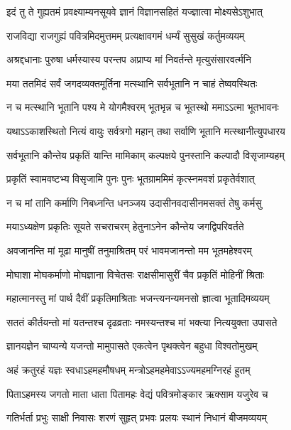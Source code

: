 \twolineshloka
{इदं तु ते गुह्यतमं प्रवक्ष्याम्यनसूयवे}
{ज्ञानं विज्ञानसहितं यज्ज्ञात्वा मोक्ष्यसेऽशुभात्}%

\twolineshloka
{राजविद्या राजगुह्यं पवित्रमिदमुत्तमम्}
{प्रत्यक्षावगमं धर्म्यं सुसुखं कर्तुमव्ययम्}%

\twolineshloka
{अश्रद्दधानाः पुरुषा धर्मस्यास्य परन्तप}
{अप्राप्य मां निवर्तन्ते मृत्युसंसारवर्त्मनि}%

\twolineshloka
{मया ततमिदं सर्वं जगदव्यक्तमूर्तिना}
{मत्स्थानि सर्वभूतानि न चाहं तेष्ववस्थितः}%

\twolineshloka
{न च मत्स्थानि भूतानि पश्य मे योगमैश्वरम्}
{भूतभृन्न च भूतस्थो ममाऽऽत्मा भूतभावनः}%

\twolineshloka
{यथाऽऽकाशस्थितो नित्यं वायुः सर्वत्रगो महान्}
{तथा सर्वाणि भूतानि मत्स्थानीत्युपधारय}%

\twolineshloka
{सर्वभूतानि कौन्तेय प्रकृतिं यान्ति मामिकाम्}
{कल्पक्षये पुनस्तानि कल्पादौ विसृजाम्यहम्}%

\twolineshloka
{प्रकृतिं स्वामवष्टभ्य विसृजामि पुनः पुनः}
{भूतग्राममिमं कृत्स्नमवशं प्रकृतेर्वशात्}%

\twolineshloka
{न च मां तानि कर्माणि निबध्नन्ति धनञ्जय}
{उदासीनवदासीनमसक्तं तेषु कर्मसु}%

\twolineshloka
{मयाऽध्यक्षेण प्रकृतिः सूयते सचराचरम्}
{हेतुनाऽनेन कौन्तेय जगद्विपरिवर्तते}%

\twolineshloka
{अवजानन्ति मां मूढा मानुषीं तनुमाश्रितम्}
{परं भावमजानन्तो मम भूतमहेश्वरम्}%

\twolineshloka
{मोघाशा मोघकर्माणो मोघज्ञाना विचेतसः}
{राक्षसीमासुरीं चैव प्रकृतिं मोहिनीं श्रिताः}%

\twolineshloka
{महात्मानस्तु मां पार्थ दैवीं प्रकृतिमाश्रिताः}
{भजन्त्यनन्यमनसो ज्ञात्वा भूतादिमव्ययम्}%

\twolineshloka
{सततं कीर्तयन्तो मां यतन्तश्च दृढव्रताः}
{नमस्यन्तश्च मां भक्त्या नित्ययुक्ता उपासते}%

\twolineshloka
{ज्ञानयज्ञेन चाप्यन्ये यजन्तो मामुपासते}
{एकत्वेन पृथक्त्वेन बहुधा विश्वतोमुखम्}%

\twolineshloka
{अहं क्रतुरहं यज्ञः स्वधाऽहमहमौषधम्}
{मन्त्रोऽहमहमेवाऽऽज्यमहमग्निरहं हुतम्}%

\twolineshloka
{पिताऽहमस्य जगतो माता धाता पितामहः}
{वेद्यं पवित्रमोङ्कार ऋक्साम यजुरेव च}%

\twolineshloka
{गतिर्भर्ता प्रभुः साक्षी निवासः शरणं सुहृत्}
{प्रभवः प्रलयः स्थानं निधानं बीजमव्ययम्}%

